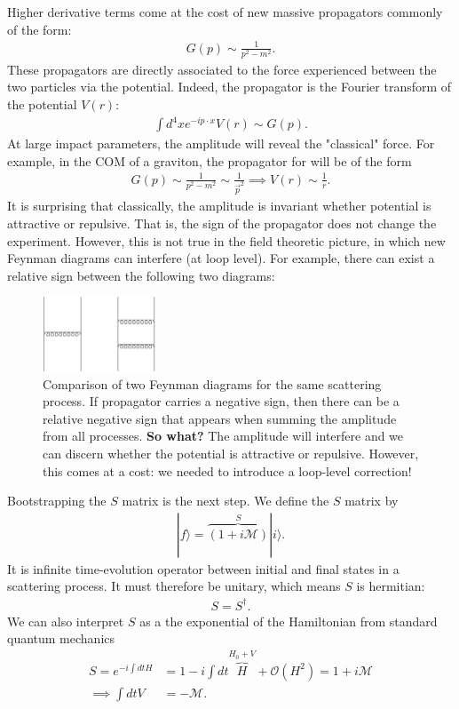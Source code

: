 \documentclass[11pt,a4paper]{article}
\begin{document}
Higher derivative terms come at the cost of new massive propagators commonly of the form:
\begin{align*}
	G(p) \sim \frac{1}{p^2 - m^2}.
\end{align*}
These propagators are directly associated to the force experienced between the two particles via the potential.  Indeed, the propagator is the Fourier transform of the potential $V(r)$:
\begin{align*}
	\int d^4 x e^{-ip\cdot x}V(r) \sim G(p).
\end{align*}
At large impact parameters, the amplitude will reveal the "classical" force.  For example, in the COM of a graviton, the propagator for will be of the form
\begin{align*}
	G(p) \sim \frac{1}{p^2 - m^2} \sim \frac{1}{\vec{p}^2} \implies V(r) \sim \frac{1}{r}.
\end{align*}
It is surprising that classically, the amplitude is invariant whether potential is attractive or repulsive.  That is, the sign of the propagator does not change the experiment.  However, this is not true in the field theoretic picture, in which new Feynman diagrams can interfere (at loop level).  For example, there can exist a relative sign between the following two diagrams:

\begin{figure}[ht]
    \centering
    \includegraphics[width=0.3\textwidth]{figures/relative_sign.pdf}
    \caption{Comparison of two Feynman diagrams for the same scattering process.  If propagator carries a negative sign, then there can be a relative negative sign that appears when summing the amplitude from all processes. \textbf{So what?}  The amplitude will interfere and we can discern whether the potential is attractive or repulsive.  However, this comes at a cost: we needed to introduce a loop-level correction!}
    \label{fig:mesh1}
\end{figure}


Bootstrapping the $S$ matrix is the next step.  We define the $S$ matrix by
\begin{align*}
	|f\rangle = \overbrace{(1 + i \mathcal M)}^{S} |i\rangle.
\end{align*}
It is infinite time-evolution operator between initial and final states in a scattering process.  It must therefore be unitary, which means $S$ is hermitian:
\begin{align*}
	S = S^{\dagger}.
\end{align*}
We can also interpret $S$ as a the exponential of the Hamiltonian from standard quantum mechanics
\begin{align*}
S = e^{-i \int dt H} & = 1 - i \int dt \overbrace{H}^{H_0 + V} + \mathcal{O}(H^2) = 1 + i \mathcal{M}\\
\implies \int dt V & = - \mathcal{M}.
\end{align*}
\end{document}
